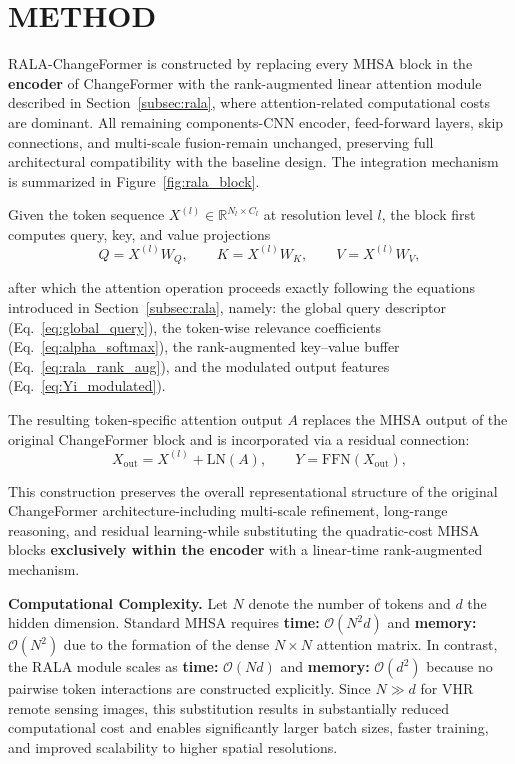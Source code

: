 \section{\uppercase{Method}}
\label{sec:method}

RALA-ChangeFormer is constructed by replacing every MHSA block in the \textbf{encoder} of ChangeFormer with the rank-augmented linear attention module described in Section~\ref{subsec:rala}, where attention-related computational costs are dominant. All remaining components-CNN encoder, feed-forward layers, skip connections, and multi-scale fusion-remain unchanged, preserving full architectural compatibility with the baseline design. The integration mechanism is summarized in Figure~\ref{fig:rala_block}.

Given the token sequence $X^{(l)} \in \mathbb{R}^{N_l \times C_l}$ at resolution level $l$, the block first computes query, key, and value projections
\begin{equation}
Q = X^{(l)}W_Q,\qquad
K = X^{(l)}W_K,\qquad
V = X^{(l)}W_V,
\label{eq:qkv_projection}
\end{equation}

after which the attention operation proceeds exactly following the equations introduced in Section~\ref{subsec:rala}, namely: the global query descriptor (Eq.~\ref{eq:global_query}), the token-wise relevance coefficients (Eq.~\ref{eq:alpha_softmax}), the rank-augmented key–value buffer (Eq.~\ref{eq:rala_rank_aug}), and the modulated output features (Eq.~\ref{eq:Yi_modulated}).

The resulting token-specific attention output $A$ replaces the MHSA output of the original ChangeFormer block and is incorporated via a residual connection:
\begin{equation}
X_{\text{out}}
    = X^{(l)} + \mathrm{LN}(A),
\qquad
Y = \mathrm{FFN}(X_{\text{out}}),
\label{eq:residual_ffn}
\end{equation}

This construction preserves the overall representational structure of the original ChangeFormer architecture-including multi-scale refinement, long-range reasoning, and residual learning-while substituting the quadratic-cost MHSA blocks \textbf{exclusively within the encoder} with a linear-time rank-augmented mechanism.

\noindent\textbf{Computational Complexity.}
Let $N$ denote the number of tokens and $d$ the hidden dimension.  
Standard MHSA requires \textbf{time: }$\mathcal{O}(N^{2}d)$ and \textbf{memory: }$\mathcal{O}(N^{2})$ due to the formation of the dense $N\times N$ attention matrix.  
In contrast, the RALA module scales as \textbf{time: }$\mathcal{O}(Nd)$ and \textbf{memory: }$\mathcal{O}(d^{2})$ because no pairwise token interactions are constructed explicitly.  
Since $N \gg d$ for VHR remote sensing images, this substitution results in substantially reduced computational cost and enables significantly larger batch sizes, faster training, and improved scalability to higher spatial resolutions.

